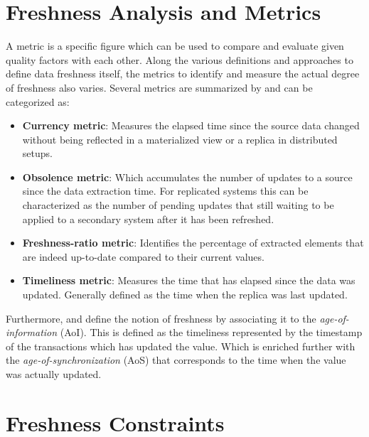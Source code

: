 \section{Freshness Analysis and Metrics}
\label{r:freshness_metrics}
A metric is a specific figure which can be used to compare and evaluate given quality factors with each other.
Along the various definitions and approaches to define data freshness itself, the metrics to identify and measure the actual degree of freshness also varies.
Several metrics are summarized by \cite{cho:2000, pacitti:2000, peralta:2006} and can be categorized as:
\begin{itemize}
    \item \textbf{Currency metric}: Measures the elapsed time since the source data changed without being reflected in a materialized view or a replica in distributed setups.
    \item \textbf{Obsolence metric}: Which accumulates the number of updates to a source since the data extraction time. For replicated systems this can be characterized as the 
    number of pending updates that still waiting to be applied to a secondary system after it has been refreshed.
    \item \textbf{Freshness-ratio metric}: Identifies the percentage of extracted elements that are indeed up-to-date compared to their current values.
    \item \textbf{Timeliness metric}: Measures the time that has elapsed since the data was updated. Generally defined as the time when the replica was last updated.
\end{itemize}


Furthermore, \cite{bedewy:2016} and \cite{zhong:2018} define the notion of freshness by associating it to the \emph{age-of-information} (AoI).
This is defined as the timeliness represented by the timestamp of the transactions which has updated the value. 
Which is enriched further with the \emph{age-of-synchronization} (AoS) that corresponds to the time when the value was actually updated.




\section{Freshness Constraints}
\label{r:express_freshness}

